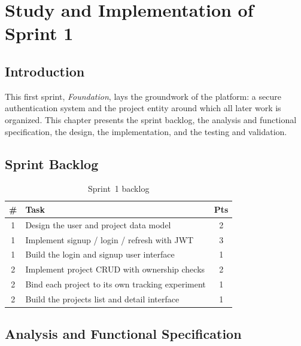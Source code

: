 \chapter{Study and Implementation of Sprint 1}
\label{chap:sprint1}

\section*{Introduction}
This first sprint, \emph{Foundation}, lays the groundwork of the platform: a secure
authentication system and the project entity around which all later work is
organized. This chapter presents the sprint backlog, the analysis and functional
specification, the design, the implementation, and the testing and validation.

\section{Sprint Backlog}
\begin{table}[H]\centering
\renewcommand{\arraystretch}{1.25}
\caption{Sprint~1 backlog}\label{tab:backlog-s1}
\begin{tabularx}{\textwidth}{|c|X|c|}
\hline
\textbf{\#} & \textbf{Task} & \textbf{Pts}\\
\hline
1 & Design the user and project data model & 2\\ \hline
1 & Implement signup / login / refresh with JWT & 3\\ \hline
1 & Build the login and signup user interface & 1\\ \hline
2 & Implement project CRUD with ownership checks & 2\\ \hline
2 & Bind each project to its own tracking experiment & 1\\ \hline
2 & Build the projects list and detail interface & 1\\ \hline
\end{tabularx}
\end{table}

\section{Analysis and Functional Specification}

